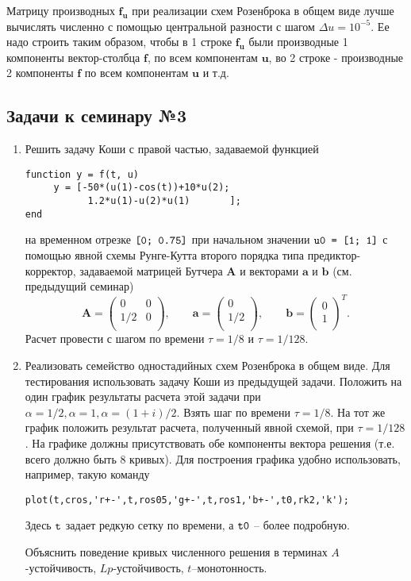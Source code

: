 Матрицу производных $\mathbf{f_u}$ при реализации схем Розенброка в общем виде лучше вычислять численно с помощью центральной разности с шагом $\Delta u = 10^{-5}$. Ее надо строить таким образом, чтобы в 1 строке $\mathbf{f_u}$ были производные 1 компоненты вектор-столбца $\mathbf{f}$, по всем компонентам $\mathbf{u}$, во 2 строке - производные 2 компоненты $\mathbf{f}$ по всем компонентам $\mathbf{u}$ и т.д.

\subsection{Задачи к семинару №3}
\begin{enumerate}
\item Решить задачу Коши с правой частью, задаваемой функцией
\begin{matlablisting}
	\begin{lstlisting}
function y = f(t, u)
     y = [-50*(u(1)-cos(t))+10*u(2); 
           1.2*u(1)-u(2)*u(1)       ];
end		
	\end{lstlisting}
\end{matlablisting}
на временном отрезке $\texttt{\lstinline|[0; 0.75]|}$
при начальном значении $\texttt{\lstinline|u0 = [1; 1]|}$ с помощью явной схемы Рунге-Кутта второго порядка типа предиктор-корректор, задаваемой матрицей Бутчера $\mathbf{A}$ и векторами $\mathbf{a}$ и $\mathbf{b}$ (см. предыдущий семинар)
\begin{equation} \nonumber
	\mathbf{A} = 
		\begin{pmatrix}
		0 & 0 \\
		1/2 & 0 \\
		\end{pmatrix},
	\qquad
	\mathbf{a} = 
		\begin{pmatrix}
		0 \\
		1/2 \\
		\end{pmatrix},
	\qquad
	\mathbf{b} = 
		\begin{pmatrix}
		0 \\
		1 \\
		\end{pmatrix}^T.
\end{equation}
Расчет провести с шагом по времени $\tau = 1/8$ и $\tau = 1/128$.
\item Реализовать семейство одностадийных схем Розенброка в общем виде. Для тестирования использовать задачу Коши из предыдущей задачи. Положить на один график результаты расчета этой задачи при $\alpha = 1/2, \alpha = 1, \alpha = (1+i)/2$. Взять шаг по времени $\tau = 1/8$. На тот же график положить результат расчета, полученный явной схемой, при $\tau = 1/128$. На графике должны присутствовать обе компоненты вектора решения (т.е. всего должно быть 8 кривых). Для построения графика удобно использовать, например, такую команду
\begin{matlablisting}
	\begin{lstlisting}
plot(t,cros,'r+-',t,ros05,'g+-',t,ros1,'b+-',t0,rk2,'k');
	\end{lstlisting}
\end{matlablisting}
Здесь $\texttt{\lstinline|t|}$ задает редкую сетку по времени, а $\texttt{\lstinline|t0|}$ – более подробную. 

Объяснить поведение кривых численного решения в терминах $A$-устойчивость, $Lp$-устойчивость, $t$–монотонность.

\end{enumerate}